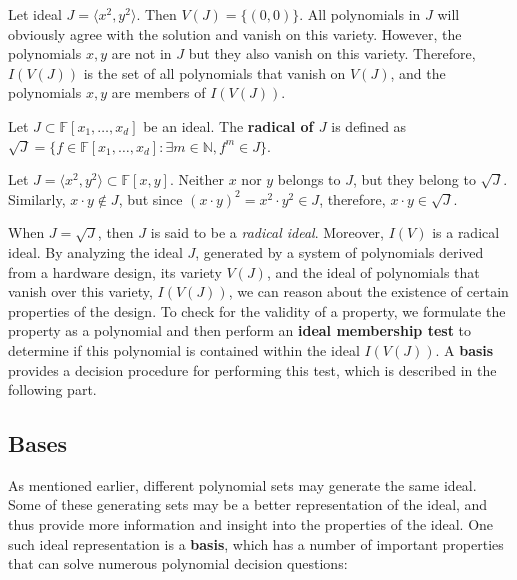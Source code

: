 \begin{Example}
	Let ideal $J=\langle x^{2},y^{2}\rangle$. Then $V(J)=\{(0,0)\}$.
	All polynomials in $J$ will obviously agree with the solution and vanish on this variety.
	However, the polynomials $x,y$ are not in $J$ but they also vanish on this variety. 
	Therefore, $I(V(J))$ is the set of all polynomials that vanish on $V(J)$, and the polynomials
	$x,y$ are members of $I(V(J))$.
\end{Example}

\begin{Definition}\label{def:radical}
Let $J \subset \mathbb{F}[x_1,\dots, x_d]$ be an ideal. The {\bf radical of $J$} is defined as $\sqrt{J} = \{f \in
\mathbb{F}[x_1,\dots, x_d]: \exists m \in \mathbb{N}, f^m \in J\}$. 
\end{Definition}

\begin{Example}
Let $J=\langle x^2,y^2\rangle \subset \mathbb{F}\left[x,y\right]$.
Neither $x$ nor $y$ belongs to $J$, but they belong to $\sqrt J$.
Similarly, $x\cdot y \notin J$, but since $(x \cdot y)^{2}=x^{2}\cdot y^{2}\in J$, therefore,
$x\cdot y \in \sqrt J$. 
\end{Example} 

When $J = \sqrt J$, then $J$ is said to be a 
{\it radical ideal}. Moreover, $I(V)$ is a radical ideal.
By analyzing the ideal $J$, generated by a system of polynomials derived 
from a hardware design, its variety $V(J)$, and the ideal of 
polynomials that vanish over this variety, $I(V(J))$, we can reason about the 
existence of certain properties of the design. To check for the validity of 
a property, we formulate the 
property as a polynomial and then perform an {\bf ideal membership test} to 
determine if this polynomial is contained within the ideal $I(V(J))$. 
A {\bf \Grobner basis} provides a decision procedure for performing this 
test, which is described in the following part. 

\subsection{\Grobner Bases}

As mentioned earlier, different polynomial sets may generate the same 
ideal. Some of these generating sets may be a better representation of 
the ideal, and thus provide more information and insight into the properties 
of the ideal. One such ideal representation is a {\bf \Grobner basis}, which has
a number of important properties that can solve numerous polynomial 
decision questions:

